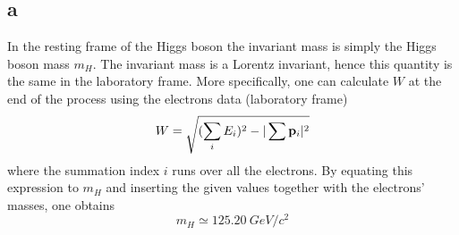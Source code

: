 \subsection*{a}
In the resting frame of the Higgs boson the invariant mass is simply the Higgs boson mass $m_H$.
The invariant mass is a Lorentz invariant, hence this quantity is the same in the laboratory frame. 
More specifically, one can calculate $W$ at the end of the process using the electrons data (laboratory frame)
\begin{equation*}
    W = \sqrt{(\sum_i E_i)^2 - |\sum \mathbf{p}_i|^2}
\end{equation*}
where the summation index $i$ runs over all the electrons.
By equating this expression to $m_H$ and inserting the given values together with the electrons' masses, one obtains
\begin{equation*}
    m_H \simeq 125.20~GeV/c^2
\end{equation*}

